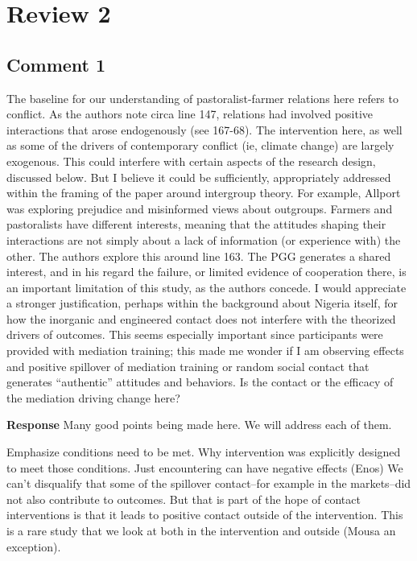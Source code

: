 \documentclass[
]{article}
\begin{document}
\hypertarget{review-2}{%
\section{Review 2}\label{review-2}}

\hypertarget{comment-1-1}{%
\subsection{Comment 1}\label{comment-1-1}}

The baseline for our understanding of pastoralist-farmer relations here
refers to conflict. As the authors note circa line 147, relations had
involved positive interactions that arose endogenously (see 167-68). The
intervention here, as well as some of the drivers of contemporary
conflict (ie, climate change) are largely exogenous. This could
interfere with certain aspects of the research design, discussed below.
But I believe it could be sufficiently, appropriately addressed within
the framing of the paper around intergroup theory. For example, Allport
was exploring prejudice and misinformed views about outgroups. Farmers
and pastoralists have different interests, meaning that the attitudes
shaping their interactions are not simply about a lack of information
(or experience with) the other. The authors explore this around line
163. The PGG generates a shared interest, and in his regard the failure,
or limited evidence of cooperation there, is an important limitation of
this study, as the authors concede. I would appreciate a stronger
justification, perhaps within the background about Nigeria itself, for
how the inorganic and engineered contact does not interfere with the
theorized drivers of outcomes. This seems especially important since
participants were provided with mediation training; this made me wonder
if I am observing effects and positive spillover of mediation training
or random social contact that generates ``authentic'' attitudes and
behaviors. Is the contact or the efficacy of the mediation driving
change here?

\textbf{Response} Many good points being made here. We will address each
of them.

Emphasize conditions need to be met. Why intervention was explicitly
designed to meet those conditions. Just encountering can have negative
effects (Enos) We can't disqualify that some of the spillover
contact--for example in the markets--did not also contribute to
outcomes. But that is part of the hope of contact interventions is that
it leads to positive contact outside of the intervention. This is a rare
study that we look at both in the intervention and outside (Mousa an
exception).
\end{document}
